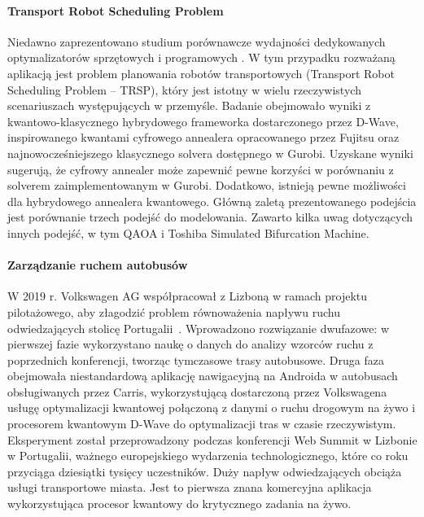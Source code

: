 \documentclass[a4paper,11pt]{article}
\begin{document}
\paragraph{Transport Robot Scheduling Problem} Niedawno zaprezentowano studium porównawcze wydajności dedykowanych optymalizatorów sprzętowych i programowych \cite{leib2023quantum}. W tym przypadku rozważaną aplikacją jest problem planowania robotów transportowych (Transport Robot Scheduling Problem -- TRSP), który jest istotny w wielu rzeczywistych scenariuszach występujących w przemyśle. Badanie obejmowało wyniki z kwantowo-klasycznego hybrydowego frameworka dostarczonego przez D-Wave, inspirowanego kwantami cyfrowego annealera opracowanego przez Fujitsu oraz najnowocześniejszego klasycznego solvera dostępnego w Gurobi. Uzyskane wyniki sugerują, że cyfrowy annealer może zapewnić pewne korzyści w porównaniu z solverem zaimplementowanym w Gurobi.  Dodatkowo, istnieją pewne możliwości dla hybrydowego annealera kwantowego. Główną zaletą prezentowanego podejścia jest porównanie trzech podejść do modelowania. Zawarto kilka uwag dotyczących innych podejść, w tym QAOA i Toshiba Simulated Bifurcation Machine.

%

\paragraph{Zarządzanie ruchem autobusów}
W 2019 r. Volkswagen AG współpracował z Lizboną w ramach projektu pilotażowego, aby złagodzić problem równoważenia napływu ruchu odwiedzających stolicę Portugalii~\cite{yarkoni2020quantum}. Wprowadzono rozwiązanie dwufazowe: w pierwszej fazie wykorzystano naukę o danych do analizy wzorców ruchu z poprzednich konferencji, tworząc tymczasowe trasy autobusowe. Druga faza obejmowała niestandardową aplikację nawigacyjną na Androida w autobusach obsługiwanych przez Carris, wykorzystującą dostarczoną przez Volkswagena usługę optymalizacji kwantowej połączoną z danymi o ruchu drogowym na żywo i procesorem kwantowym D-Wave do optymalizacji tras w czasie rzeczywistym. Eksperyment został przeprowadzony podczas konferencji Web Summit w Lizbonie w Portugalii, ważnego europejskiego wydarzenia technologicznego, które co roku przyciąga dziesiątki tysięcy uczestników. Duży napływ odwiedzających obciąża usługi transportowe miasta.  Jest to pierwsza znana komercyjna aplikacja wykorzystująca procesor kwantowy do krytycznego zadania na żywo.
\end{document}
